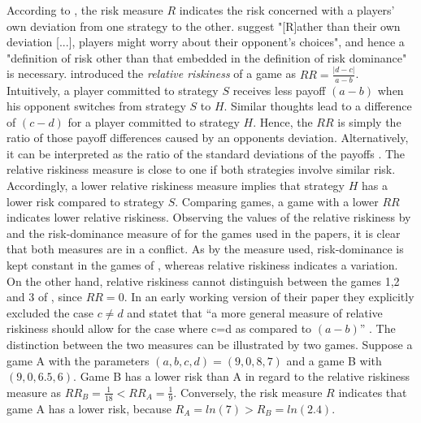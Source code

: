 According to \textcite{rydval_loss_2005}, the risk measure $R$ indicates 
the risk concerned with a players' own deviation from one strategy to the
other.
\textcite[19]{rydval_loss_2005} suggest "[R]ather than their
own deviation [...], players might worry about their opponent's choices", 
and hence a "definition of risk other than that embedded in the definition
of risk dominance" is necessary.
\textcite[371]{dubois_optimization_2012} 
introduced the \textit{relative riskiness} of a game as
$RR = \frac{|d-c|}{a-b}$.
Intuitively, a player committed to strategy $S$ receives less payoff $(a-b)$  
when his opponent switches from strategy $S$ to $H$. Similar thoughts lead
to a difference of $(c-d)$ for a player committed to strategy $H$. Hence, the
$RR$ is simply the ratio of those payoff differences caused by an opponents
deviation.
Alternatively, it can be interpreted as the ratio of the 
standard deviations of the payoffs 
\parencite[372]{dubois_optimization_2012}. 
The relative riskiness measure is close to one if both strategies involve
similar risk. Accordingly, a lower relative riskiness measure implies that
strategy $H$ has a lower risk compared to strategy $S$.
Comparing games, a game with a lower $RR$ indicates lower relative riskiness.
Observing the values of the relative riskiness by 
\textcite{dubois_optimization_2012} and the risk-dominance measure of 
\textcite{schmidt_playing_2003} for the games used in the papers, it is clear
that both measures are in a conflict. As by the measure 
\textcite{schmidt_playing_2003} used, risk-dominance is kept 
constant in the games of  \textcite{battalio_optimization_2001}, 
whereas relative riskiness indicates a variation. 
On the other hand, relative riskiness cannot distinguish between
the games 1,2 and 3 of \textcite{schmidt_playing_2003}, since $RR=0$. In an
early working version of their paper they explicitly excluded the case 
$c \neq d$ and statet that ``a more general measure of relative riskiness 
should allow for the case where c=d as compared to $(a-b)$'' 
\parencite{dubois_optimization_2008}. The distinction between the two
measures can be illustrated by two games. Suppose a game A with the parameters 
$(a,b,c,d) =(9,0,8,7)$ and a game B with $(9,0,6.5,6)$. 
Game B has a lower risk than A in regard to the relative riskiness
measure as $RR_B=\frac{1}{18} < RR_A =\frac19$. Conversely, the 
risk measure $R$ indicates that game A has a lower risk, because
$R_A =ln(7) > R_B=ln(2.4)$.

